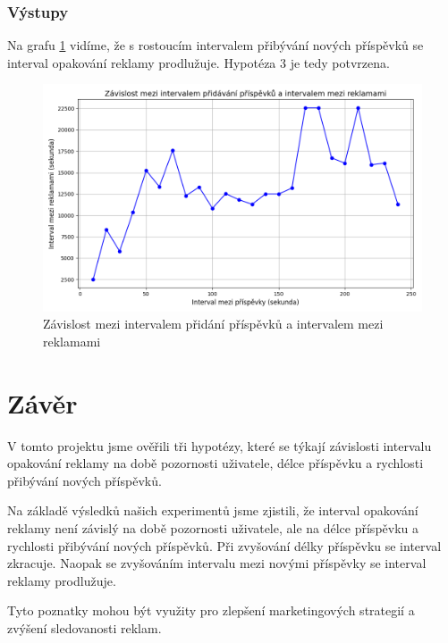 \documentclass[11pt, a4paper]{article}
\begin{document}
\subsubsection{Výstupy}
Na grafu \ref{fig:post_arrival_time_vs_ad_interval} vidíme, že s rostoucím intervalem přibývání nových příspěvků se interval opakování reklamy prodlužuje. 
Hypotéza 3 je tedy potvrzena.
\begin{figure}[h]
    \centering
    \includegraphics[width=\linewidth]{post_arrival_time_vs_ad_interval.png}
    \caption{Závislost mezi intervalem přidání příspěvků a intervalem mezi reklamami}
    \label{fig:post_arrival_time_vs_ad_interval}
\end{figure}
\newpage

\section{Závěr}
V tomto projektu jsme ověřili tři hypotézy, které se týkají závislosti intervalu opakování reklamy na době pozornosti uživatele, délce příspěvku a rychlosti přibývání nových příspěvků.

Na základě výsledků našich experimentů jsme zjistili, že interval opakování reklamy není závislý na době pozornosti uživatele, ale na délce příspěvku a rychlosti přibývání nových příspěvků.
Při zvyšování délky příspěvku se interval zkracuje.
Naopak se zvyšováním intervalu mezi novými příspěvky se interval reklamy prodlužuje.

Tyto poznatky mohou být využity pro zlepšení marketingových strategií a zvýšení sledovanosti reklam. 



    
\end{document}
